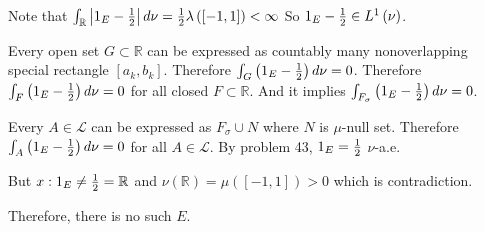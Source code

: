 Note that $\int_{\mathbb{R}}\left | 1_E - {1\over 2} \right | d\nu = {1\over 2}\lambda\left( \left[ -1, 1 \right] \right) < \infty$ So $1_E - {1\over 2} \in L^1\left( \nu \right)$.

Every open set $G\subset \mathbb{R}$ can be expressed as countably many nonoverlapping special rectangle $\left[ a_k, b_k \right]$. Therefore $\int_{G} \left( 1_E - {1\over 2} \right) d\nu = 0$. Therefore $\int_{F}\left( 1_E - {1\over 2} \right) d\nu = 0$ for all closed $F \subset \mathbb{R}$. And it implies $\int_{F_{\sigma}}\left( 1_E - {1\over 2} \right)d\nu = 0$.

Every $A\in \mathcal{L}$ can be expressed as $F_{\sigma} \cup N$ where $N$ is $\mu$-null set.
Therefore $\int_{A}\left( 1_E - {1\over 2} \right)d\nu = 0$ for all $A\in \mathcal{L}$. By problem 43, $1_E = {1\over 2}$ $\nu$-a.e.

But ${x : 1_E \ne {1\over 2}} = \mathbb{R}$ and $\nu\left( \mathbb{R} \right) = \mu\left( \left[ -1, 1 \right] \right) > 0$ which is contradiction.

Therefore, there is no such $E$.
